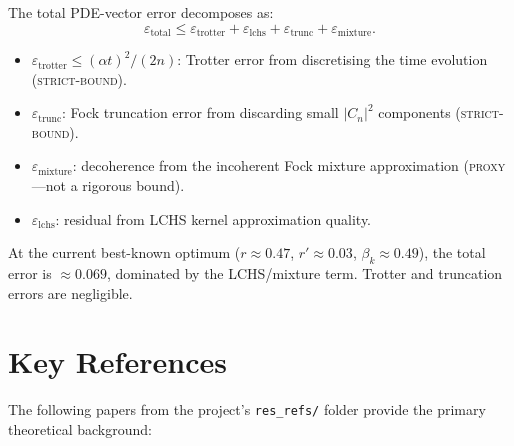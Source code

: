 \documentclass[11pt]{article}
\begin{document}
The total PDE-vector error decomposes as:
\begin{equation}
\varepsilon_{\mathrm{total}} \leq
\varepsilon_{\mathrm{trotter}} + \varepsilon_{\mathrm{lchs}}
+ \varepsilon_{\mathrm{trunc}} + \varepsilon_{\mathrm{mixture}}.
\end{equation}
\begin{itemize}[nosep]
\item $\varepsilon_{\mathrm{trotter}} \leq (\alpha t)^2/(2n)$:
  Trotter error from discretising the time evolution (\textsc{strict-bound}).
\item $\varepsilon_{\mathrm{trunc}}$: Fock truncation error from
  discarding small $|C_n|^2$ components (\textsc{strict-bound}).
\item $\varepsilon_{\mathrm{mixture}}$: decoherence from the incoherent
  Fock mixture approximation (\textsc{proxy}---not a rigorous bound).
\item $\varepsilon_{\mathrm{lchs}}$: residual from LCHS kernel
  approximation quality.
\end{itemize}

At the current best-known optimum ($r \approx 0.47$, $r' \approx 0.03$,
$\beta_k \approx 0.49$), the total error is $\approx 0.069$, dominated
by the LCHS/mixture term.  Trotter and truncation errors are negligible.

\section{Key References}
\label{sec:refs}

The following papers from the project's \texttt{res\_refs/} folder provide
the primary theoretical background:
\end{document}
